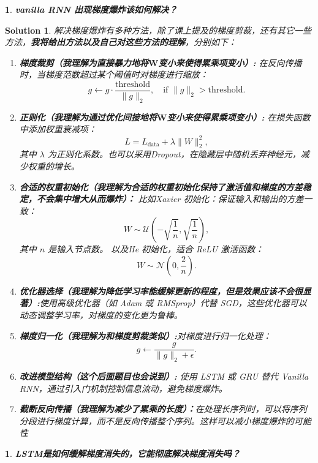 \documentclass{article}
\theoremstyle{Problem}
\newtheorem{prob}[subsection]{}
\theoremstyle{Solution}
\newtheorem*{sol}{Solution}
\begin{document}
	\newpage
	
	\begin{prob}
		\textbf{vanilla RNN 出现梯度爆炸该如何解决？}
	\end{prob}
	
	\begin{sol}
		解决梯度爆炸有多种方法，除了课上提及的梯度剪裁，还有其它一些方法，\textbf{我将给出方法以及自己对这些方法的理解}，分别如下：
		\begin{enumerate}
			\item \textbf{梯度裁剪（我理解为直接暴力地将$\mathbf{W}$变小来使得累乘项变小）:} 在反向传播时，当梯度范数超过某个阈值时对梯度进行缩放：
			\[
			g \leftarrow g \cdot \frac{\text{threshold}}{\|g\|_2}, \quad \text{if } \|g\|_2 > \text{threshold}.
			\]
			\item \textbf{正则化（我理解为通过优化间接地将$\mathbf{W}$变小来使得累乘项变小）:} 在损失函数中添加权重衰减项：
			\[
			L = L_{\text{data}} + \lambda \|W\|_2^2,
			\]
			其中 \( \lambda \) 为正则化系数。也可以采用Dropout，在隐藏层中随机丢弃神经元，减少权重的增长。
			\item \textbf{合适的权重初始化（我理解为合适的权重初始化保持了激活值和梯度的方差稳定，不会集中增大从而爆炸）：} 比如Xavier 初始化：保证输入和输出的方差一致：
			\[
			W \sim \mathcal{U}\left(-\sqrt{\frac{1}{n}}, \sqrt{\frac{1}{n}}\right),
			\]
			其中 \( n \) 是输入节点数。
			以及He 初始化，适合 ReLU 激活函数：
			\[
			W \sim \mathcal{N}\left(0, \frac{2}{n}\right).
			\]
			\item \textbf{优化器选择（我理解为降低学习率能缓解更新的程度，但是效果应该不会很显著）:}使用高级优化器（如 Adam 或 RMSprop）代替 SGD，这些优化器可以动态调整学习率，对梯度的变化更为鲁棒。
			\item \textbf{梯度归一化（我理解为和梯度剪裁类似）:}对梯度进行归一化处理：
			\[
			g \leftarrow \frac{g}{\|g\|_2 + \epsilon}.
			\]
			\item \textbf{改进模型结构（这个后面题目也会说到）:} 使用 LSTM 或 GRU 替代 Vanilla RNN，通过引入门机制控制信息流动，避免梯度爆炸。
			\item \textbf{截断反向传播（我理解为减少了累乘的长度）：}在处理长序列时，可以将序列分段进行梯度计算，而不是反向传播整个序列。这样可以减小梯度爆炸的可能性
		\end{enumerate}
	\end{sol}
	\newpage
	
	\begin{prob}
		\textbf{LSTM是如何缓解梯度消失的，它能彻底解决梯度消失吗？}
	\end{prob}
	
\end{document}
